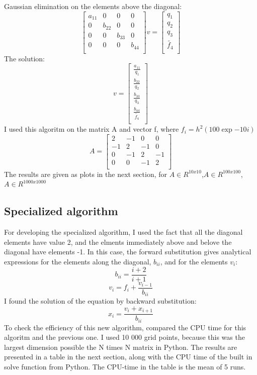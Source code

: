 \documentclass{article}
\begin{document}
Gaussian elimination on the elements above the diagonal:
$$
\begin{bmatrix}
a_{11} & 0 & 0 & 0 \\
0 & b_{22} & 0 & 0 \\
0 & 0 & b_{33} & 0 \\
0 & 0 & 0 & b_{44} \\
\end{bmatrix}
v=
\begin{bmatrix}
q_1\\
q_2\\
q_3\\
\tilde{f_4}\\
\end{bmatrix}
$$
The solution:
$$
v=
\begin{bmatrix}
\frac{a_{11}}{q_1}\\
\frac{b_{22}}{q_2}\\
\frac{b_{33}}{q_3}\\
\frac{b_{44}}{\tilde{f_4}}\\
\end{bmatrix}
$$
I used this algoritm on the matrix A and vector f, where $f_i =h^{2}(100\exp{-10i})$
$$
A=
\begin{bmatrix}
2 & -1 & 0 & 0 \\
-1 & 2 & -1 & 0 \\
0 & -1 & 2  & -1 \\
0 & 0 & -1 & 2 \\
\end{bmatrix}
$$
The results are given as plots in the next section, for $A \in R^{10x10}$,$A \in R^{100x100}$, $A \in R^{1000x1000}$
\subsection{Specialized algorithm}
For developing the specialized algorithm, I used the fact that all the diagonal elements have value 2, and the elments immediately above and belove the diagonal have elements -1. In this case, the forward substitution gives analytical expressions for the elements along the diagonal, $b_{ii}$, and  for the elements $v_i$: 
$$ b_{ii} = \frac{i+2}{i+1}$$
$$v_i = f_i+\frac{v_{i-1}}{b_{ii}}$$
I found the solution of the equation by backward substitution:
$$
x_i= \frac{v_i+x_{i+1}}{b_{ii}}
$$
To check the efficiency of this new algorithm, compared the CPU time for this algoritm and the previous one. I used 10 000 grid points, because this was the largest dimension possible the N times N matrix in Python. The results are presented in a table in the next section, along with the CPU time of the built in solve function from Python. The CPU-time in the table is the mean of 5 runs.
\end{document}
